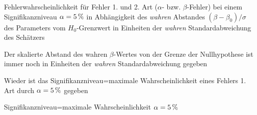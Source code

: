 \documentclass[a4paper]{foils}
\begin{document}
\begin{landscape}
\begin{center}
\newpage
\vspace{1em}
\parbox{1.1\textwidth}{Fehlerwahrscheinlichkeit f\"ur Fehler 1. und
  2. Art ($\alpha$- bzw. $\beta$-Fehler) bei einem Signifikanzniveau
  $\alpha=\unit[5]{\%}$ in 
  Abh\"angigkeit des \emph{wahren} Abstandes  $(\beta-\beta_{0})/\sigma$
des Parameters vom $H_0$-Grenzwert in Einheiten der \emph{wahren} Standardabweichung des Sch\"atzers 
}
\newpage
\vspace{1em}
\parbox{1.1\textwidth}{Der skalierte Abstand des wahren $\beta$-Wertes von der Grenze der
Nullhypothese ist immer noch in Einheiten der \emph{wahren}
Standardabweichung gegeben
}

\newpage
\vspace{1em}
\parbox{1.1\textwidth}{Wieder ist das Signifikanzniveau=maximale Wahrscheinlichkeit eines
Fehlers 1. Art durch $\alpha=\unit[5]{\%}$ gegeben}

\newpage
\vspace{1em}


\newpage
\vspace{1em}
\parbox{1.1\textwidth}{Signifikanzniveau=maximale Wahrscheinlichkeit
  $\alpha=\unit[5]{\%}$}



\end{center}
\end{landscape}
\end{document}

